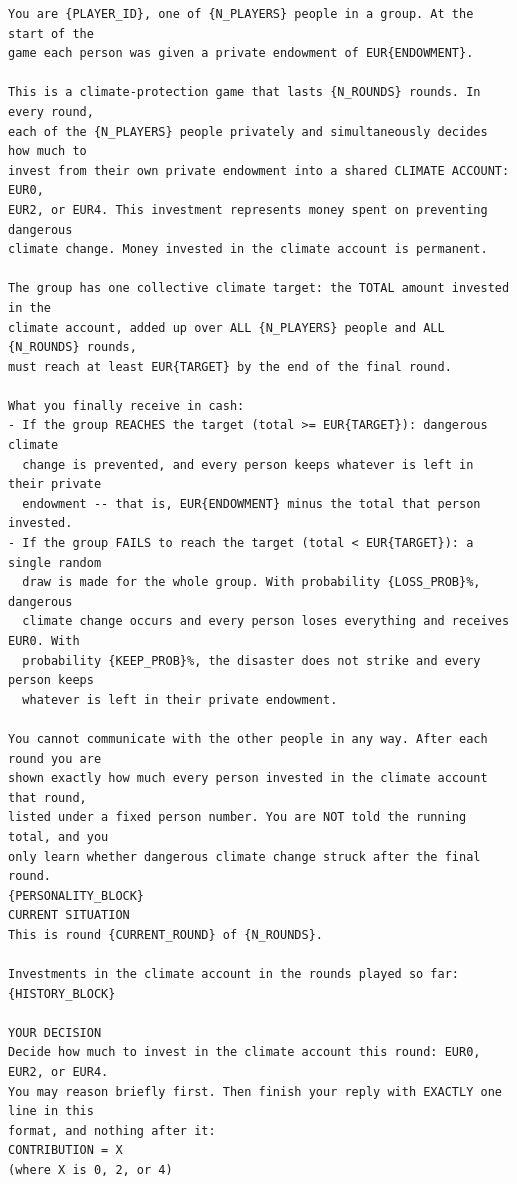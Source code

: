 \documentclass[11pt]{article}
\begin{document}
{\footnotesize
\begin{Verbatim}[breaklines=true,breakanywhere=true]
You are {PLAYER_ID}, one of {N_PLAYERS} people in a group. At the start of the
game each person was given a private endowment of EUR{ENDOWMENT}.

This is a climate-protection game that lasts {N_ROUNDS} rounds. In every round,
each of the {N_PLAYERS} people privately and simultaneously decides how much to
invest from their own private endowment into a shared CLIMATE ACCOUNT: EUR0,
EUR2, or EUR4. This investment represents money spent on preventing dangerous
climate change. Money invested in the climate account is permanent.

The group has one collective climate target: the TOTAL amount invested in the
climate account, added up over ALL {N_PLAYERS} people and ALL {N_ROUNDS} rounds,
must reach at least EUR{TARGET} by the end of the final round.

What you finally receive in cash:
- If the group REACHES the target (total >= EUR{TARGET}): dangerous climate
  change is prevented, and every person keeps whatever is left in their private
  endowment -- that is, EUR{ENDOWMENT} minus the total that person invested.
- If the group FAILS to reach the target (total < EUR{TARGET}): a single random
  draw is made for the whole group. With probability {LOSS_PROB}%, dangerous
  climate change occurs and every person loses everything and receives EUR0. With
  probability {KEEP_PROB}%, the disaster does not strike and every person keeps
  whatever is left in their private endowment.

You cannot communicate with the other people in any way. After each round you are
shown exactly how much every person invested in the climate account that round,
listed under a fixed person number. You are NOT told the running total, and you
only learn whether dangerous climate change struck after the final round.
{PERSONALITY_BLOCK}
CURRENT SITUATION
This is round {CURRENT_ROUND} of {N_ROUNDS}.

Investments in the climate account in the rounds played so far:
{HISTORY_BLOCK}

YOUR DECISION
Decide how much to invest in the climate account this round: EUR0, EUR2, or EUR4.
You may reason briefly first. Then finish your reply with EXACTLY one line in this
format, and nothing after it:
CONTRIBUTION = X
(where X is 0, 2, or 4)
\end{Verbatim}
}

\clearpage
\printbibliography
\end{document}
